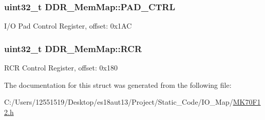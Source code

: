 \subsubsection[{P\+A\+D\+\_\+\+C\+T\+R\+L}]{\setlength{\rightskip}{0pt plus 5cm}uint32\+\_\+t D\+D\+R\+\_\+\+Mem\+Map\+::\+P\+A\+D\+\_\+\+C\+T\+R\+L}\label{struct_d_d_r___mem_map_abeb11d4cc28f5bb277d0cd4a46cb2ce1}
I/\+O Pad Control Register, offset\+: 0x1\+A\+C \hypertarget{struct_d_d_r___mem_map_a46f3bdf0cbb782701ad3edd860cfb667}{}
\subsubsection[{R\+C\+R}]{\setlength{\rightskip}{0pt plus 5cm}uint32\+\_\+t D\+D\+R\+\_\+\+Mem\+Map\+::\+R\+C\+R}\label{struct_d_d_r___mem_map_a46f3bdf0cbb782701ad3edd860cfb667}
R\+C\+R Control Register, offset\+: 0x180 

The documentation for this struct was generated from the following file\+:\begin{DoxyCompactItemize}
\item 
C\+:/\+Users/12551519/\+Desktop/es18aut13/\+Project/\+Static\+\_\+\+Code/\+I\+O\+\_\+\+Map/\hyperlink{_m_k70_f12_8h}{M\+K70\+F12.\+h}\end{DoxyCompactItemize}
